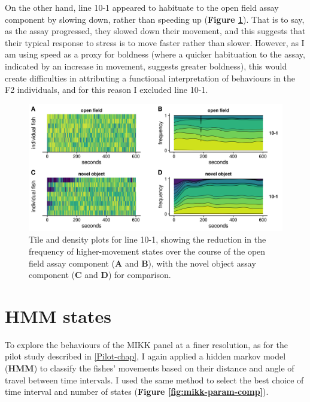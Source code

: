 \documentclass[
]{book}
\begin{document}
On the other hand, line \textcolor{10-1_F8766D}{10-1} appeared to habituate to the open field assay component by slowing down, rather than speeding up (\textbf{Figure \ref{fig:10-1-dens}}). That is to say, as the assay progressed, they slowed down their movement, and this suggests that their typical response to stress is to move faster rather than slower. However, as I am using speed as a proxy for boldness (where a quicker habituation to the assay, indicated by an increase in movement, suggests greater boldness), this would create difficulties in attributing a functional interpretation of behaviours in the F2 individuals, and for this reason I excluded line \textcolor{10-1_F8766D}{10-1}.



\begin{figure}
\includegraphics[width=1\linewidth]{figs/mikk_behaviour/select_0.08_15_10-1_dge} \caption{Tile and density plots for line \textcolor{10-1_F8766D}{10-1}, showing the reduction in the frequency of higher-movement states over the course of the open field assay component (\textbf{A} and \textbf{B}), with the novel object assay component (\textbf{C} and \textbf{D}) for comparison.}\label{fig:10-1-dens}
\end{figure}

\hypertarget{hmm-states}{%
\section{HMM states}\label{hmm-states}}

To explore the behaviours of the MIKK panel at a finer resolution, as for the pilot study described in \ref{Pilot-chap}, I again applied a hidden markov model (\textbf{HMM}) to classify the fishes' movements based on their distance and angle of travel between time intervals. I used the same method to select the best choice of time interval and number of states (\textbf{Figure \ref{fig:mikk-param-comp}}).
\end{document}
